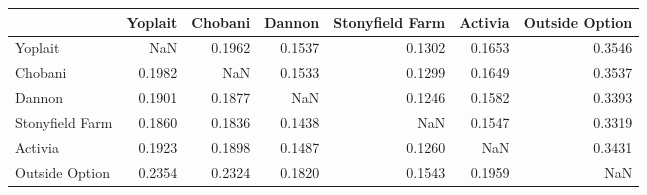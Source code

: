 \begin{tabular}{lrrrrrr}
\toprule
 & Yoplait & Chobani & Dannon & Stonyfield Farm & Activia & Outside Option \\
\midrule
Yoplait & NaN & 0.1962 & 0.1537 & 0.1302 & 0.1653 & 0.3546 \\
Chobani & 0.1982 & NaN & 0.1533 & 0.1299 & 0.1649 & 0.3537 \\
Dannon & 0.1901 & 0.1877 & NaN & 0.1246 & 0.1582 & 0.3393 \\
Stonyfield Farm & 0.1860 & 0.1836 & 0.1438 & NaN & 0.1547 & 0.3319 \\
Activia & 0.1923 & 0.1898 & 0.1487 & 0.1260 & NaN & 0.3431 \\
Outside Option & 0.2354 & 0.2324 & 0.1820 & 0.1543 & 0.1959 & NaN \\
\bottomrule
\end{tabular}